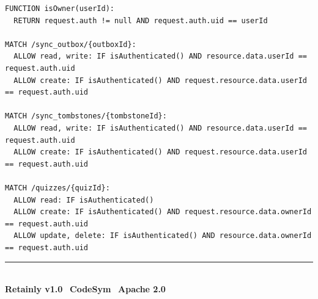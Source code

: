 \documentclass[12pt,a4paper,openany]{report}
\begin{document}
\begin{verbatim}
FUNCTION isOwner(userId):
  RETURN request.auth != null AND request.auth.uid == userId

MATCH /sync_outbox/{outboxId}:
  ALLOW read, write: IF isAuthenticated() AND resource.data.userId == request.auth.uid
  ALLOW create: IF isAuthenticated() AND request.resource.data.userId == request.auth.uid

MATCH /sync_tombstones/{tombstoneId}:
  ALLOW read, write: IF isAuthenticated() AND resource.data.userId == request.auth.uid
  ALLOW create: IF isAuthenticated() AND request.resource.data.userId == request.auth.uid

MATCH /quizzes/{quizId}:
  ALLOW read: IF isAuthenticated()
  ALLOW create: IF isAuthenticated() AND request.resource.data.ownerId == request.auth.uid
  ALLOW update, delete: IF isAuthenticated() AND resource.data.ownerId == request.auth.uid
\end{verbatim}

\vfill
\begin{center}
\rule{0.5\textwidth}{0.4pt}\\[1em]
\textbf{Retainly v1.0} \textbar\ \textbf{CodeSym} \textbar\ \textbf{Apache 2.0}
\end{center}
\end{document}
